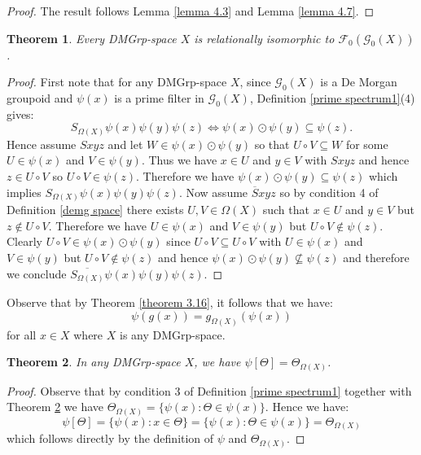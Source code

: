 \documentclass{amsart}
\theoremstyle{plain}
\newtheorem{theorem}{Theorem}[section]
\theoremstyle{definition}
\begin{document}
\begin{proof}
    The result follows Lemma \ref{lemma 4.3} and Lemma \ref{lemma 4.7}. 
\end{proof}
\begin{theorem}
    Every DMGrp-space $X$ is relationally isomorphic to $\mathcal{F}_0(\mathcal{G}_0(X))$.  
\end{theorem}
\begin{proof}
    First note that for any DMGrp-space $X$, since $\mathcal{G}_0(X)$ is a De Morgan groupoid and $\psi(x)$ is a prime filter in $\mathcal{G}_0(X)$, Definition \ref{prime spectrum1}(4) gives: 
    \[S_{\Omega(X)}\psi(x)\psi(y)\psi(z)\Longleftrightarrow\psi(x)\odot\psi(y)\subseteq\psi(z).\]
    Hence assume $Sxyz$ and let $W\in\psi(x)\odot\psi(y)$ so that $U\circ V\subseteq W$ for some $U\in\psi(x)$ and $V\in\psi(y)$. Thus we have $x\in U$ and $y\in V$ with $Sxyz$ and hence $z\in U\circ V$ so $U\circ V\in\psi(z)$. Therefore we have $\psi(x)\odot\psi(y)\subseteq\psi(z)$ which implies $S_{\Omega(X)}\psi(x)\psi(y)\psi(z)$. Now assume $\overline{S}xyz$ so by condition 4 of Definition \ref{demg space} there exists $U,V\in\Omega(X)$ such that $x\in U$ and $y\in V$ but $z\not\in U\circ V$. Therefore we have $U\in\psi(x)$ and $V\in\psi(y)$ but $U\circ V\not\in\psi(z)$. Clearly $U\circ V\in\psi(x)\odot\psi(y)$ since $U\circ V\subseteq U\circ V$ with $U\in\psi(x)$ and $V\in\psi(y)$ but $U\circ V\not\in\psi(z)$ and hence $\psi(x)\odot\psi(y)\not\subseteq\psi(z)$ and therefore we conclude $\overline{S_{\Omega(X)}}\psi(x)\psi(y)\psi(z)$.  
\end{proof}
Observe that by Theorem \ref{theorem 3.16}, it follows that we have: \[\psi(g(x))=g_{\Omega(X)}(\psi(x))\] for all $x\in X$ where $X$ is any DMGrp-space. 
\begin{theorem}\label{algebraic realization 2}
    In any DMGrp-space $X$, we have $\psi[\Theta]=\Theta_{\Omega(X)}$. 
\end{theorem}
\begin{proof}
    Observe that by condition 3 of Definition \ref{prime spectrum1} together with Theorem \ref{algebraic realization 2} we have  $\Theta_{\Omega(X)}=\{\psi(x):\Theta\in\psi(x)\}$. Hence we have: 
    \[\psi[\Theta]=\{\psi(x):x\in\Theta\}=\{\psi(x):\Theta\in\psi(x)\}=\Theta_{\Omega(X)}\] which follows directly by the definition of $\psi$ and $\Theta_{\Omega(X)}$. 
\end{proof}
\end{document}
